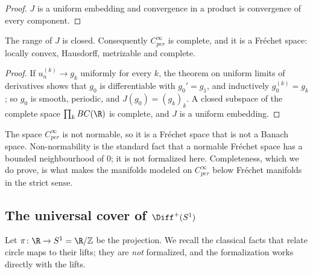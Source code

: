 \begin{proof}
  \leanok
  $J$ is a uniform embedding and convergence in a product is convergence of every component.
\end{proof}

\begin{theorem}
  \label{thm:ex-cinfper-frechet}
  \leanok
  The range of $J$ is closed. Consequently $C^\infty_{per}$ is complete, and it is a Fréchet
  space: locally convex, Hausdorff, metrizable and complete.
\end{theorem}

\begin{proof}
  \leanok
  If $u_n^{(k)} \to g_k$ uniformly for every $k$, the theorem on uniform limits of derivatives
  shows that $g_0$ is differentiable with $g_0' = g_1$, and inductively $g_0^{(k)} = g_k$; so
  $g_0$ is smooth, periodic, and $J(g_0) = (g_k)_k$. A closed subspace of the complete space
  $\prod_k BC(\R)$ is complete, and $J$ is a uniform embedding.
\end{proof}

\begin{remark}
  The space $C^\infty_{per}$ is not normable, so it is a Fréchet space that is not a Banach
  space. Non-normability is the standard fact that a normable Fréchet space has a bounded
  neighbourhood of $0$; it is not formalized here. Completeness, which we do prove, is what
  makes the manifolds modeled on $C^\infty_{per}$ below Fréchet manifolds in the strict sense.
\end{remark}

\subsection{The universal cover of \texorpdfstring{$\Diff^+(S^1)$}{Diff+(S1)}}

Let $\pi \colon \R \to S^1 = \R/\mathbb Z$ be the projection. We recall the classical facts
that relate circle maps to their lifts; they are \emph{not} formalized, and the formalization
works directly with the lifts.

